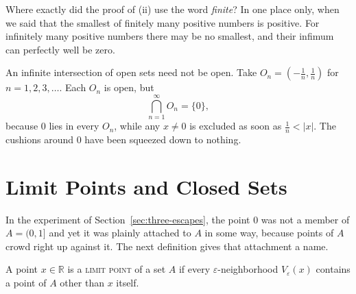 Where exactly did the proof of (ii) use the word \emph{finite}?  In one place only, when we said that the smallest of finitely many positive numbers is positive.  For infinitely many positive numbers there may be no smallest, and their infimum can perfectly well be zero.

\begin{dangerousbend}
An infinite intersection of open sets need not be open.  Take $O_n = \left(-\frac{1}{n}, \frac{1}{n}\right)$ for $n = 1, 2, 3, \ldots$.  Each $O_n$ is open, but
\[ \bigcap_{n=1}^{\infty} O_n = \{0\}, \]
because $0$ lies in every $O_n$, while any $x \neq 0$ is excluded as soon as $\frac{1}{n} < |x|$.  The cushions around $0$ have been squeezed down to nothing.
\end{dangerousbend}

\begin{marginfigure}
\centering
{}
\caption{The open intervals $\left(-\frac1n,\frac1n\right)$ shrink onto the single point $0$.  All that survives in the intersection is a set that is not open.}
\end{marginfigure}

\section{Limit Points and Closed Sets}

In the experiment of Section~\ref{sec:three-escapes}, the point $0$ was not a member of $A = (0,1]$ and yet it was plainly attached to $A$ in some way, because points of $A$ crowd right up against it.  The next definition gives that attachment a name.

\begin{definition}\label{def:limit-point}
A point $x \in \mathbb{R}$ is a \textsc{limit point} of a set $A$ if every $\varepsilon$-neighborhood $V_{\varepsilon}(x)$ contains a point of $A$ other than $x$ itself.
\end{definition}

